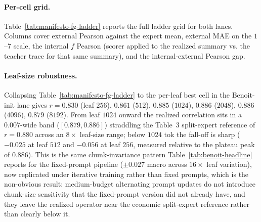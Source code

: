 \paragraph{Per-cell grid.} Table~\ref{tab:manifesto-fg-ladder} reports
the full ladder grid for both lanes. Columns cover external Pearson
against the expert mean, external MAE on the $1$--$7$ scale, the
internal $f$ Pearson (scorer applied to the realized summary vs. the
teacher trace for that same summary), and the internal-external Pearson gap.

\begin{table}[htbp]
    \centering
    \resizebox*{!}{0.88\textheight}{\resizebox{\linewidth}{!}{}}
    \caption{Per-cell ladder grid on the economic policy dimension
    (seven-point scale).
    Stage labels use the notation defined in
    Figure~\ref{fig:manifesto-fg-ladder-heatmaps}.
    Both lanes collapse inherited stages (where a later stage reused
    the preceding evaluation) into the first stage at which each
    distinct evaluation appeared. Bold external-$r$ values are the
    best cell within each lane; bold internal-external gap values are
    the tightest (closest to parity) within each
    lane.}\label{tab:manifesto-fg-ladder}
\end{table}

\paragraph{Leaf-size robustness.} Collapsing
Table~\ref{tab:manifesto-fg-ladder} to the per-leaf best cell in the
Benoit-init lane gives $r = 0.830$ (leaf $256$), $0.861$ ($512$),
$0.885$ ($1024$), $0.886$ ($2048$), $0.886$ ($4096$), $0.879$ ($8192$).
From leaf $1024$ onward the realized correlation sits in a $0.007$-wide
band ($[0.879, 0.886]$) straddling the \citet{BenoitEtAl2025} Table~3
split-expert reference of $r = 0.880$ across an $8\times$ leaf-size
range; below $1024$ tok the fall-off is sharp ($-0.025$ at leaf $512$
and $-0.056$ at leaf $256$, measured relative to the plateau peak of
$0.886$). This is the same chunk-invariance
pattern Table~\ref{tab:benoit-headline} reports for the fixed-prompt
pipeline ($\pm 0.027$ macro across $16\times$ leaf variation), now
replicated under iterative training rather than fixed prompts, which
is the non-obvious result: medium-budget alternating prompt updates do not
introduce chunk-size sensitivity that the fixed-prompt version did
not already have, and they leave the realized operator near the
economic split-expert reference rather than clearly below it.

